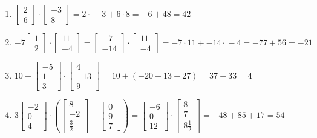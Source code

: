 \documentclass[11pt]{article}
\begin{document}
\begin{enumerate}
	\item %
$
\begin{bmatrix}
2 \\
6
\end{bmatrix}\cdot{}
\begin{bmatrix}
-3 \\
8
\end{bmatrix}=
2\cdot{}-3+6\cdot{}8=-6+48=42
$
	\item %
$
-7\begin{bmatrix}
1 \\
2
\end{bmatrix}\cdot{}
\begin{bmatrix}
11 \\
-4
\end{bmatrix}=
\begin{bmatrix}
-7 \\
-14
\end{bmatrix}\cdot{}
\begin{bmatrix}
11 \\
-4
\end{bmatrix}=-7\cdot{}11+-14\cdot{}-4=-77+56=-21
$
	\item %
$
10+
\begin{bmatrix}
-5 \\
1 \\
3
\end{bmatrix}\cdot{}
\begin{bmatrix}
4 \\
-13 \\
9
\end{bmatrix}=
10+(-20-13+27)=37-33=4
$
	\item %
$
3\begin{bmatrix}
-2 \\
0 \\
4
\end{bmatrix}\cdot{}
\left(
\begin{bmatrix}
8 \\
-2 \\
\frac{3}{2}
\end{bmatrix}+
\begin{bmatrix}
0 \\
9 \\
7
\end{bmatrix}
\right)=
\begin{bmatrix}
-6 \\
0 \\
12
\end{bmatrix}\cdot{}
\begin{bmatrix}
8 \\
7 \\
8\frac{1}{2}
\end{bmatrix}=
-48+85+17=54
$
\end{enumerate}
\end{document}
